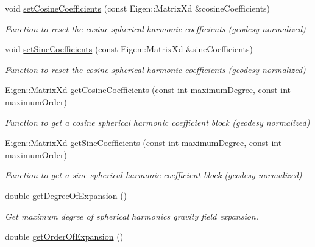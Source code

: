 \begin{DoxyCompactItemize}
void \hyperlink{classtudat_1_1gravitation_1_1SphericalHarmonicsGravityField_afaf543f1c8794f0af32b805dbb29730f}{set\+Cosine\+Coefficients} (const Eigen\+::\+Matrix\+Xd \&cosine\+Coefficients)
\begin{DoxyCompactList}\small\item\em Function to reset the cosine spherical harmonic coefficients (geodesy normalized) \end{DoxyCompactList}\item 
void \hyperlink{classtudat_1_1gravitation_1_1SphericalHarmonicsGravityField_a04734e29e1016ad3e0ba7ae092bd9995}{set\+Sine\+Coefficients} (const Eigen\+::\+Matrix\+Xd \&sine\+Coefficients)
\begin{DoxyCompactList}\small\item\em Function to reset the cosine spherical harmonic coefficients (geodesy normalized) \end{DoxyCompactList}\item 
Eigen\+::\+Matrix\+Xd \hyperlink{classtudat_1_1gravitation_1_1SphericalHarmonicsGravityField_ada23fad9bd92013b6c7ce8eb38eafc11}{get\+Cosine\+Coefficients} (const int maximum\+Degree, const int maximum\+Order)
\begin{DoxyCompactList}\small\item\em Function to get a cosine spherical harmonic coefficient block (geodesy normalized) \end{DoxyCompactList}\item 
Eigen\+::\+Matrix\+Xd \hyperlink{classtudat_1_1gravitation_1_1SphericalHarmonicsGravityField_a20c8db7a240d2f4ec378cdd45a75b631}{get\+Sine\+Coefficients} (const int maximum\+Degree, const int maximum\+Order)
\begin{DoxyCompactList}\small\item\em Function to get a sine spherical harmonic coefficient block (geodesy normalized) \end{DoxyCompactList}\item 
double \hyperlink{classtudat_1_1gravitation_1_1SphericalHarmonicsGravityField_ad0c6a6b513a1d7f6807fb3ea5dfd87c8}{get\+Degree\+Of\+Expansion} ()
\begin{DoxyCompactList}\small\item\em Get maximum degree of spherical harmonics gravity field expansion. \end{DoxyCompactList}\item 
double \hyperlink{classtudat_1_1gravitation_1_1SphericalHarmonicsGravityField_afe9bf8e063be715be4478828759ad988}{get\+Order\+Of\+Expansion} ()

\end{DoxyCompactItemize}

